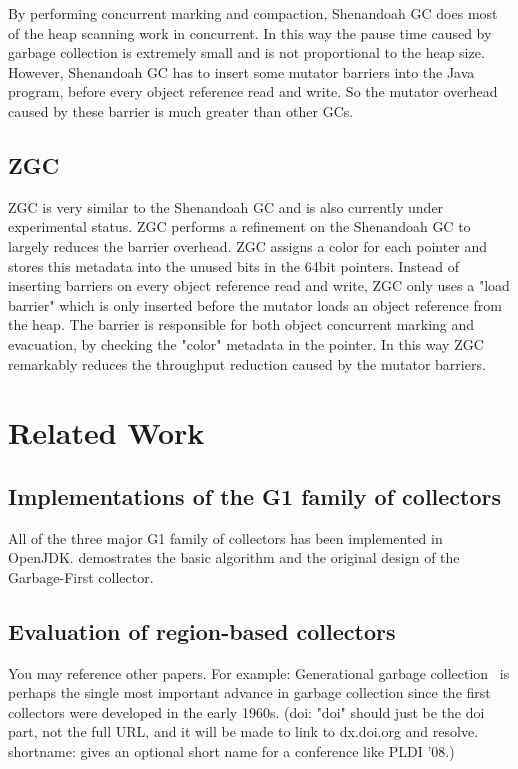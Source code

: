 By performing concurrent marking and compaction, Shenandoah GC does most of the
heap scanning work in concurrent. In this way the pause time caused by garbage collection
is extremely small and is not proportional to the heap size.
However, Shenandoah GC has to insert some mutator barriers into the Java program,
before every object reference read and write. So the mutator overhead caused by
these barrier is much greater than other GCs.

\subsection{ZGC}

ZGC is very similar to the Shenandoah GC and is also currently under experimental status.
ZGC performs a refinement on the Shenandoah GC to largely reduces the barrier
overhead.
ZGC assigns a color for each pointer and stores this metadata into the
unused bits in the 64bit pointers.
Instead of inserting barriers on every object reference read and write,
ZGC only uses a "load barrier" which is only inserted before the mutator loads an
object reference from the heap. The barrier is responsible for both object concurrent marking
and evacuation, by checking the "color" metadata in the pointer.
In this way ZGC remarkably reduces the throughput reduction caused by the mutator
barriers.

\section{Related Work}
\label{sec:relatedwork}

\subsection{Implementations of the G1 family of collectors}

All of the three major G1 family of collectors has been implemented in OpenJDK.
\cite{detlefs2004garbage} demostrates the basic algorithm and the original design
of the Garbage-First collector.

\subsection{Evaluation of region-based collectors}

You may reference other papers. For example: 
Generational garbage collection~\citep{LH:83,Moon:84,Ungar:84} is perhaps the
single most important advance in garbage collection since the first collectors
were developed in the early 1960s. (doi: "doi" should just be the doi part, not
the full URL, and it will be made to link to dx.doi.org and resolve.
shortname: gives an optional short name for a conference like PLDI '08.)





